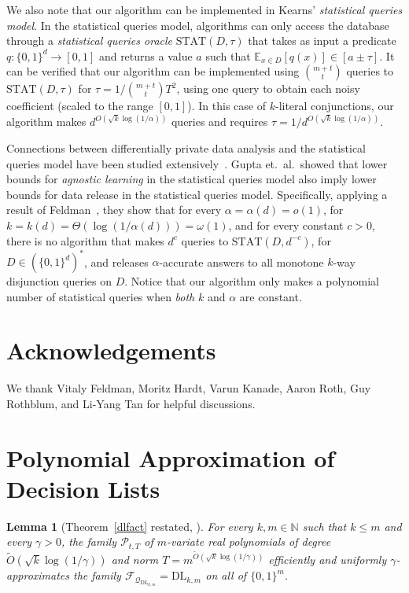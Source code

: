 \documentclass[11pt]{article}
\newcommand\N{\mathbb{N}}
\newcommand\cF{\mathcal{F}}
\newcommand\cP{\mathcal{P}}
\newcommand\cQ{\mathcal{Q}}
\newcommand\bits{\{0,1\}}
\newcommand\from{\colon}
\newcommand{\Ex}[2]{\mathbb{E}_{#1}\left[#2\right]}
\newtheorem{lemma}[theorem]{Lemma}
\theoremstyle{definition}
\begin{document}
We also note that our algorithm can be implemented in Kearns' \emph{statistical queries model}.  In the statistical queries model, algorithms can only access the database through a \emph{statistical queries oracle} $\mathrm{STAT}(D, \tau)$ that takes as input a predicate $q \from \bits^d \to [0,1]$ and returns a value $a$ such that $\Ex{x \in D}{q(x)} \in [a \pm \tau]$.  It can be verified that our algorithm can be implemented using $\binom{m+t}{t}$ queries to $\mathrm{STAT}(D, \tau)$ for $\tau = 1/\binom{m+t}{t} T^2$, using one query to obtain each noisy coefficient (scaled to the range $[0,1]$).  In this case of $k$-literal conjunctions, our algorithm makes $d^{O(\sqrt{k}\log(1/\alpha))}$ queries and requires $\tau = 1/d^{O(\sqrt{k}\log(1/\alpha))}$.

Connections between differentially private data analysis and the statistical queries model have been studied extensively~\cite{BlumDwMcNi05, KasiviswanathanLeNiRaSm07, GuptaHaRoUl11}.  Gupta et.~al.~showed that lower bounds for \emph{agnostic learning} in the statistical queries model also imply lower bounds for data release in the statistical queries model.  Specifically, applying a result of Feldman~\cite{Feldman09}, they show that for every $\alpha = \alpha(d) = o(1)$, for $k = k(d) = \Theta(\log(1/\alpha(d))) = \omega(1)$, and for every constant $c > 0$, there is no algorithm that makes $d^c$ queries to $\mathrm{STAT}(D, d^{-c})$, for $D \in (\bits^d)^*$, and releases $\alpha$-accurate answers to all monotone $k$-way disjunction queries on $D$.  Notice that our algorithm only makes a polynomial number of statistical queries when \emph{both} $k$ and $\alpha$ are constant.

\else
\fi

\section*{Acknowledgements}

We thank Vitaly Feldman, Moritz Hardt, Varun Kanade, Aaron Roth, Guy Rothblum, and Li-Yang Tan for helpful discussions.



\appendix




\ifnum{}
\section{Polynomial Approximation of Decision Lists}
\label{app:dlfact}
\begin{lemma}[Theorem~\ref{dlfact} restated, \cite{KlivansSe04}]  For every $k, m \in \N$ such that $k \leq m$ and every $\gamma > 0$, the family $\cP_{t, T}$ of $m$-variate real polynomials of degree $\tilde{O}\left(\sqrt{k} \log(1/\gamma)\right)$ and norm $T = m^{\tilde{O}\left(\sqrt{k} \log(1/\gamma)\right)}$ efficiently and uniformly $\gamma$-approximates the family $\cF_{\cQ_{\mathrm{DL}_{k,m}}} = \mathrm{DL}_{k,m}$ on all of $\bits^m$.
\end{lemma}
\end{document}
